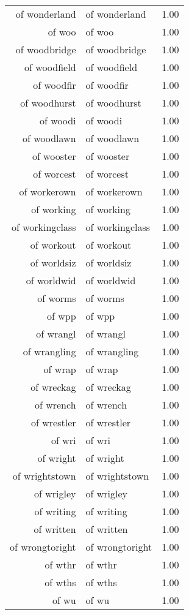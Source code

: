 \begin{table}[ht]
\begin{tabular}{rlr}
  of wonderland & of wonderland & 1.00 \\ 
  of woo & of woo & 1.00 \\ 
  of woodbridge & of woodbridge & 1.00 \\ 
  of woodfield & of woodfield & 1.00 \\ 
  of woodfir & of woodfir & 1.00 \\ 
  of woodhurst & of woodhurst & 1.00 \\ 
  of woodi & of woodi & 1.00 \\ 
  of woodlawn & of woodlawn & 1.00 \\ 
  of wooster & of wooster & 1.00 \\ 
  of worcest & of worcest & 1.00 \\ 
  of workerown & of workerown & 1.00 \\ 
  of working & of working & 1.00 \\ 
  of workingclass & of workingclass & 1.00 \\ 
  of workout & of workout & 1.00 \\ 
  of worldsiz & of worldsiz & 1.00 \\ 
  of worldwid & of worldwid & 1.00 \\ 
  of worms & of worms & 1.00 \\ 
  of wpp & of wpp & 1.00 \\ 
  of wrangl & of wrangl & 1.00 \\ 
  of wrangling & of wrangling & 1.00 \\ 
  of wrap & of wrap & 1.00 \\ 
  of wreckag & of wreckag & 1.00 \\ 
  of wrench & of wrench & 1.00 \\ 
  of wrestler & of wrestler & 1.00 \\ 
  of wri & of wri & 1.00 \\ 
  of wright & of wright & 1.00 \\ 
  of wrightstown & of wrightstown & 1.00 \\ 
  of wrigley & of wrigley & 1.00 \\ 
  of writing & of writing & 1.00 \\ 
  of written & of written & 1.00 \\ 
  of wrongtoright & of wrongtoright & 1.00 \\ 
  of wthr & of wthr & 1.00 \\ 
  of wths & of wths & 1.00 \\ 
  of wu & of wu & 1.00 \\ 

\end{tabular}
\end{table}
